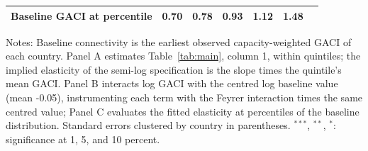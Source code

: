\begin{table}[htbp]
\begin{threeparttable}
\begin{tabular}{lcccccc}
  Baseline GACI at percentile & 0.70 & 0.78 & 0.93 & 1.12 & 1.48 & \\
\bottomrule
\end{tabular}
\begin{tablenotes}[flushleft]
\footnotesize
\item Notes: Baseline connectivity is the earliest observed capacity-weighted GACI of each country. Panel A estimates Table~\ref{tab:main}, column 1, within quintiles; the implied elasticity of the semi-log specification is the slope times the quintile's mean GACI. Panel B interacts log GACI with the centred log baseline value (mean -0.05), instrumenting each term with the Feyrer interaction times the same centred value; Panel C evaluates the fitted elasticity at percentiles of the baseline distribution. Standard errors clustered by country in parentheses. $^{***}$, $^{**}$, $^{*}$: significance at 1, 5, and 10 percent.
\end{tablenotes}
\end{threeparttable}
\end{table}

